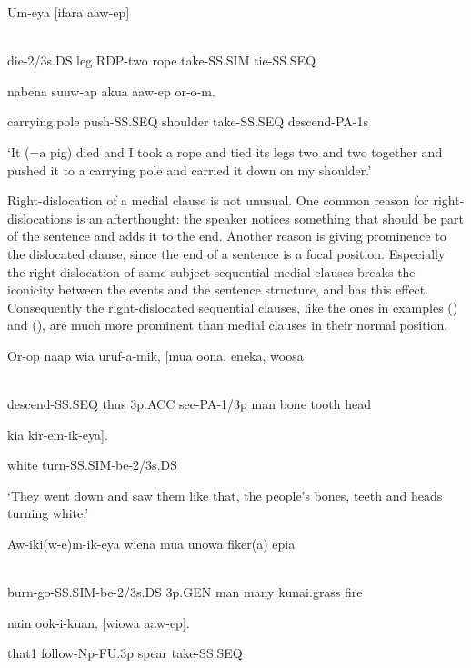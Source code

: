 \ea%
\label{ex:x1468}
\gll Um-eya    [ifara  aaw-ep]   \\
      \\
\glt
\z

die-2/3s.DS  leg  RDP-two  rope  take-SS.SIM  tie-SS.SEQ

nabena  suuw-ap  akua  aaw-ep  or-o-m.

carrying.pole  push-SS.SEQ  shoulder  take-SS.SEQ  descend-PA-1s

`It (=a pig) died and I took a rope and tied its legs two and two together and pushed it to a carrying pole and carried it down on my shoulder.'

Right-dislocation of a medial clause is not unusual. One common reason for right-dislocations is an afterthought: the speaker notices something that should be part of the sentence and adds it to the end. Another reason is giving prominence to the dislocated clause, since the end of a sentence is a focal position. Especially the right-dislocation of same-subject sequential medial clauses breaks the iconicity between the events and the sentence structure, and has this effect. Consequently the right-dislocated  sequential clauses, like the ones in examples () and (), are much more prominent than medial clauses in their normal position.

\ea%
\label{ex:x1471}
\gll Or-op  naap  wia  uruf-a-mik,  [mua  oona,  eneka,  woosa  \\
      \\
\glt
\z

descend-SS.SEQ  thus  3p.ACC  see-PA-1/3p  man  bone  tooth  head

kia  kir-em-ik-eya].

white  turn-SS.SIM-be-2/3s.DS

`They went down and saw them like that, the people's bones, teeth and heads turning white.'

\ea%
\label{ex:x1469}
\gll Aw-iki(w-e)m-ik-eya  wiena  mua  unowa  fiker(a)  epia \\
      \\
\glt
\z

burn-go-SS.SIM-be-2/3s.DS  3p.GEN  man  many  kunai.grass  fire

nain  ook-i-kuan,  [wiowa  aaw-ep].

that1  follow-Np-FU.3p  spear  take-SS.SEQ

